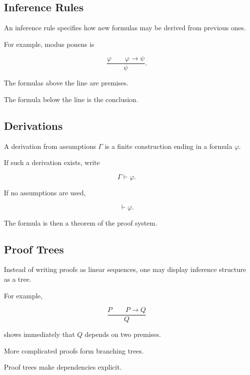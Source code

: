\subsection{Inference Rules}
\label{subsec:proof-theoretic-inference-rules}

An inference rule specifies how new formulas may be derived from previous
ones.

For example, modus ponens is

\[
\boxed{
\frac{
\varphi
\qquad
\varphi\rightarrow\psi
}{
\psi
}.
}
\]

The formulas above the line are premises.

The formula below the line is the conclusion.

\subsection{Derivations}
\label{subsec:formal-derivations-proof-theory}

A derivation from assumptions \(\Gamma\) is a finite construction ending in
a formula \(\varphi\).

If such a derivation exists, write

\[
\boxed{
\Gamma\vdash\varphi.
}
\]

If no assumptions are used,

\[
\boxed{
\vdash\varphi.
}
\]

The formula is then a theorem of the proof system.

\subsection{Proof Trees}
\label{subsec:proof-trees}

Instead of writing proofs as linear sequences, one may display inference
structure as a tree.

For example,

\[
\frac{
P
\qquad
P\rightarrow Q
}{
Q
}
\]

shows immediately that \(Q\) depends on two premises.

More complicated proofs form branching trees.

Proof trees make dependencies explicit.

